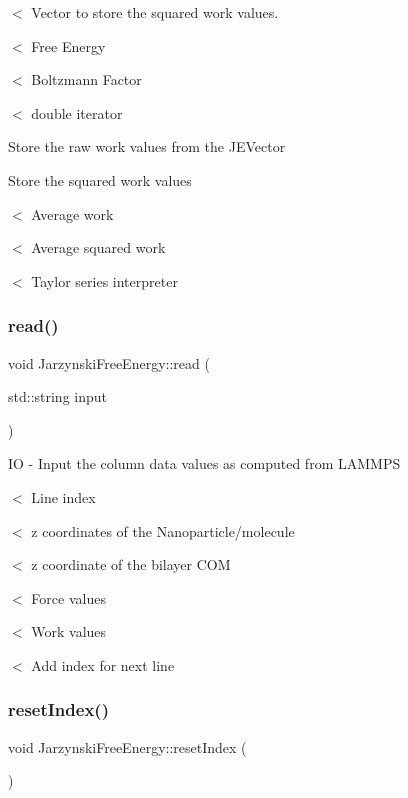 $<$ Vector to store the squared work values.

$<$ Free Energy

$<$ Boltzmann Factor

$<$ double iterator

Store the raw work values from the J\+E\+Vector

Store the squared work values

$<$ Average work

$<$ Average squared work

$<$ Taylor series interpreter \mbox{\label{classJarzynskiFreeEnergy_a4d6391b365eee3e95932b9166320dc70}} 
\subsubsection{\texorpdfstring{read()}{read()}}
{\footnotesize\ttfamily void Jarzynski\+Free\+Energy\+::read (\begin{DoxyParamCaption}\item[{std\+::string}]{input }\end{DoxyParamCaption})}

IO -\/ Input the column data values as computed from L\+A\+M\+M\+PS

$<$ Line index

$<$ z coordinates of the Nanoparticle/molecule

$<$ z coordinate of the bilayer C\+OM

$<$ Force values

$<$ Work values

$<$ Add index for next line \mbox{\label{classJarzynskiFreeEnergy_a0488e0cac955936c16405ff5ec8de5c1}} 
\subsubsection{\texorpdfstring{reset\+Index()}{resetIndex()}}
{\footnotesize\ttfamily void Jarzynski\+Free\+Energy\+::reset\+Index (\begin{DoxyParamCaption}{ }\end{DoxyParamCaption})}

